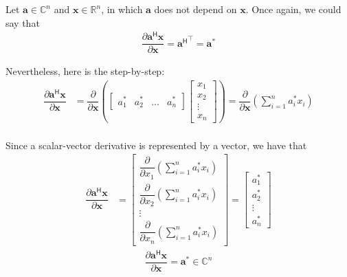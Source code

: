 \documentclass{article}
\newcommand{\trans}{\top}
\newcommand{\hermit}{\mathsf{H}}
\begin{document}
Let \(\mathbf{a} \in \mathbb{C}^{n}\) and \(\mathbf{x}\in \mathbb{R}^{n}\), in which \(\mathbf{a}\) does not depend on \(\mathbf{x}\). Once again, we could say that
\begin{align}
    \dfrac{\partial \mathbf{a}^\hermit \mathbf{x}}{\partial \mathbf{x}} = {\mathbf{a}^\hermit}^\trans = \mathbf{a}^*
\end{align}

Nevertheless, here is the step-by-step:
\begin{align}
    \dfrac{\partial \mathbf{a}^\hermit \mathbf{x}}{\partial \mathbf{x}} &= \dfrac{\partial}{\partial \mathbf{x}} \left(
    \begin{bmatrix}
        a^*_1 & a^*_2 & \dots & a^*_n
    \end{bmatrix} \begin{bmatrix}
        x_{1} \\ x_{2} \\ \vdots \\ x_{n}
    \end{bmatrix} \right) 
    = \dfrac{\partial}{\partial \mathbf{x}} \left( \sum_{i = 1}^n a^*_ix_i \right) \\
\end{align}

Since a scalar-vector derivative is represented by a vector, we have that
\begin{align}
    \dfrac{\partial \mathbf{a}^\hermit \mathbf{x}}{\partial \mathbf{x}} &= \begin{bmatrix}
        \dfrac{\partial}{\partial x_1} \left( \sum_{i = 1}^n a^*_ix_i \right) \\ \dfrac{\partial}{\partial x_2} \left( \sum_{i = 1}^n a^*_ix_i \right) \\ \vdots \\ \dfrac{\partial}{\partial x_n} \left( \sum_{i = 1}^n a^*_ix_i \right) 
    \end{bmatrix}
    = \begin{bmatrix}
        a^*_1 \\ a^*_2 \\ \vdots \\ a^*_n
    \end{bmatrix}
\end{align}
\begin{align}
    \boxed{\dfrac{\partial \mathbf{a}^\hermit \mathbf{x}}{\partial \mathbf{x}} = \mathbf{a}^* \in \mathbb{C}^{n}}
\end{align}
\end{document}
